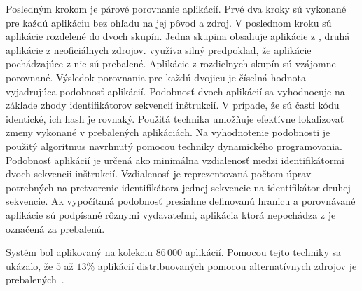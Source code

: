 Posledným krokom je párové porovnanie aplikácií. Prvé dva kroky sú vykonané pre každú aplikáciu bez ohľadu na jej pôvod a zdroj. V poslednom kroku sú aplikácie rozdelené do dvoch skupín. Jedna skupina obsahuje aplikácie z , druhá aplikácie z neoficiálnych zdrojov.   využíva silný predpoklad, že aplikácie pochádzajúce z  nie sú prebalené. 
Aplikácie z rozdielnych skupín sú vzájomne porovnané. Výsledok porovnania pre každú dvojicu je číselná hodnota vyjadrujúca podobnosť aplikácií. Podobnosť dvoch aplikácií sa vyhodnocuje na základe zhody identifikátorov sekvencií inštrukcií. V prípade, že sú časti kódu identické, ich hash je rovnaký. Použitá technika umožňuje efektívne lokalizovať zmeny vykonané v prebalených aplikáciách. 
Na vyhodnotenie podobnosti je použitý algoritmus navrhnutý pomocou techniky dynamického programovania. Podobnosť aplikácií je určená ako minimálna vzdialenosť medzi identifikátormi dvoch sekvencii inštrukcií.  Vzdialenosť je reprezentovaná počtom úprav potrebných na pretvorenie identifikátora jednej sekvencie na identifikátor druhej sekvencie. Ak vypočítaná podobnosť presiahne definovanú hranicu a porovnávané aplikácie sú podpísané rôznymi vydavateľmi, aplikácia ktorá nepochádza z  je označená za prebalenú.

Systém  bol aplikovaný na kolekciu $86\,000$ aplikácií. Pomocou tejto techniky sa ukázalo, že $5$ až $13\%$  aplikácií distribuovaných pomocou alternatívnych zdrojov je prebalených~\cite{DetectingRepackagedZhou}.
